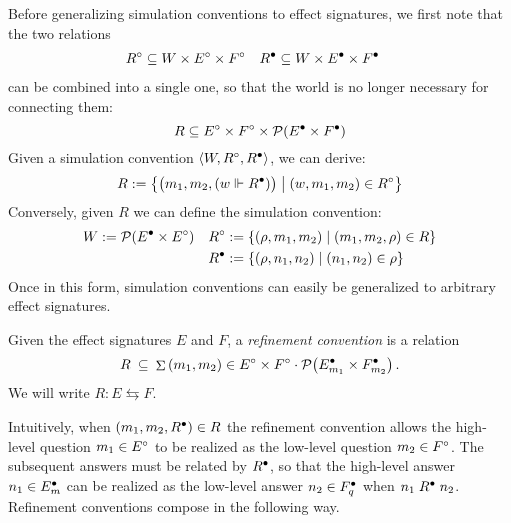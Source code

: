 \documentclass[sigplan,10pt,authordraft]{acmart}
\newcommand{\bdot}{\cdot}
\begin{document}
Before generalizing simulation conventions to effect signatures,
we first note that the two relations
\begin{align*}
  R^\circ &\subseteq W \times E^\circ \times F^\circ &
  R^\bullet &\subseteq W \times E^\bullet \times F^\bullet
\end{align*}
can be combined into a single one,
so that the world is no longer necessary for connecting them:
\[
  R \subseteq E^\circ \times F^\circ \times
    \mathcal{P}(E^\bullet \times F^\bullet)
\]
Given a simulation convention $\langle W, R^\circ, R^\bullet \rangle$,
we can derive:
\[
  R := \big\{
    \big(m_1, m_2, (w \Vdash R^\bullet) \big)
    \mathrel{\big|} (w, m_1, m_2) \in R^\circ \big\}
\]
Conversely, given $R$ we can define the simulation convention:
\begin{align*}
  W &:= \mathcal{P}(E^\bullet \times E^\circ) &
  R^\circ &:= \{ (\rho, m_1, m_2) \mid (m_1, m_2, \rho) \in R \} \\&&
  R^\bullet &:= \{ (\rho, n_1, n_2) \mid (n_1, n_2) \in \rho \}
\end{align*}
Once in this form,
simulation conventions
can easily be generalized to arbitrary effect signatures.

\begin{definition}
Given the effect signatures $E$ and $F$,
a \emph{refinement convention} is a relation
\[
  R \:\subseteq\:
    \mathop\Sigma {(m_1, m_2) \in E^\que \times F^\que} \bdot
    \mathcal{P} \big( E^\ans_{m_1} \times F^\ans_{m_2} \big) \,.
\]
We will write $R : E \leftrightarrows F$.
\end{definition}

Intuitively,
when $(m_1, m_2, R^\bullet) \in R$
the refinement convention allows
the high-level question $m_1 \in E^\circ$ to be realized as
the low-level question $m_2 \in F^\circ$.
The subsequent answers must be related by $R^\bullet$, so that
the high-level answer $n_1 \in E^\bullet_m$ can be realized as
the low-level answer $n_2 \in F^\bullet_q$ when $n_1 \mathrel{R^\bullet} n_2$.
Refinement conventions compose in the following way.
\end{document}
